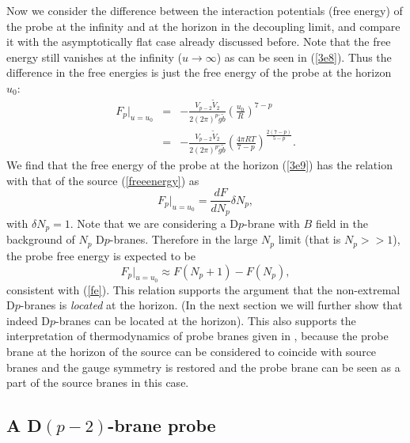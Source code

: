 \documentclass[a4paper,12pt]{article}
\begin{document}
Now we consider the difference between the interaction potentials (free
energy) of the probe at the infinity and at the horizon in the decoupling
limit, and compare it with the asymptotically flat case already discussed
before. Note that the free energy still vanishes at the infinity ($u \to
\infty$) as can be seen in (\ref{3e8}). Thus the difference in the free
energies is just the free energy of the probe at the horizon $u_0$:
\begin{eqnarray}
F_p|_{u=u_0} &=&- \frac{V_{p-2}\tilde{V}_2}{2(2\pi)^p\tilde{g}\tilde{b}}
    \left( \frac{u_0}{R}\right)^{7-p} \nonumber \\
\label{3e9}
    &=&  - \frac{V_{p-2}\tilde{V}_2}{2(2\pi)^{p}\tilde{g}\tilde{b}}
   \left(\frac{4\pi RT}{7-p}\right)^{\frac{2(7-p)}{5-p}}.
\end{eqnarray}
We find that the free energy of the probe at the horizon (\ref{3e9}) has
the relation with that of the source (\ref{freeenergy}) as
\begin{equation}
F_p|_{u=u_0}=\frac{dF}{dN_p}\delta N_p,
\label{fe}
\end{equation}
with $\delta N_p=1$. Note that we are considering a D$p$-brane with $B$ field
in the background of $N_p$ D$p$-branes. Therefore in the large $N_p$ limit
(that is $N_p>>1$), the probe free energy is expected to be
\begin{equation}
F_p|_{u=u_0} \approx F(N_p+1)-F(N_p),
\end{equation}
consistent with (\ref{fe}). This relation supports the argument that the
non-extremal D$p$-branes is {\it located} at the horizon. (In the next
section we will further show that indeed D$p$-branes can be located at the
horizon). This also supports the interpretation of thermodynamics of probe
branes given in \cite{AA,Kirit}, because the probe brane at the horizon of
the source can be considered to coincide with source branes and the gauge
symmetry is restored and the probe brane can be seen as a part of
the source branes in this case.


\subsection{A D$(p-2)$-brane probe}
\end{document}
